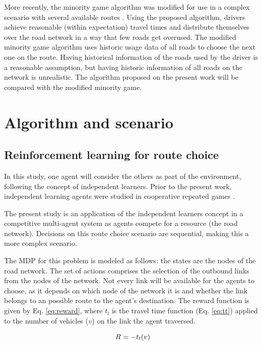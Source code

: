 \documentclass[12pt]{article}
\newcommand{\travTime}{\ensuremath{t_l}} 	%
\newcommand{\veh}{\ensuremath{v}}		%
\newcommand{\reward}[1][]{\ensuremath{R_#1}}	%
\begin{document}
More recently, the minority game algorithm was modified for use in a complex scenario with several available routes \cite{Galib&Moser2011}. Using the proposed algorithm, drivers achieve reasonable (within expectation) travel times and distribute themselves over the road network in a way that few roads get overused. The modified minority game algorithm uses historic usage data of all roads to choose the next one on the route. Having historical information of the roads used by the driver is a reasonable assumption, but having historic information of all roads on the network is unrealistic. The algorithm proposed on the present work will be compared with the modified minority game. 

\section{Algorithm and scenario}
\label{sec:proposal}

\subsection{Reinforcement learning for route choice}

In this study, one agent will consider the others as part of the environment, following the concept of independent learners. Prior to the present work, independent learning agents were studied in cooperative repeated games \cite{Claus&Boutilier1998, Tan1993, Sen+1994}.

The present study is an application of the independent learners concept in a competitive multi-agent system as agents compete for a resource (the road network). Decisions on this route choice scenario are sequential, making this a more complex scenario. %

The MDP for this problem is modeled as follows: the states are the nodes of the road network. The set of actions comprises the selection of the outbound links from the nodes of the network. Not every link will be available for the agents to choose, as it depends on which node of the network it is and whether the link belongs to an possible route to the agent's destination. The reward function is given by Eq. \eqref{eq:reward}, where $\travTime$ is the travel time function (Eq. \eqref{eq:tt}) applied to the number of vehicles ($\veh$) on the link the agent traversed.

\begin{equation}
\label{eq:reward}
\reward{} = - \travTime(\veh)
\end{equation}
\end{document}
